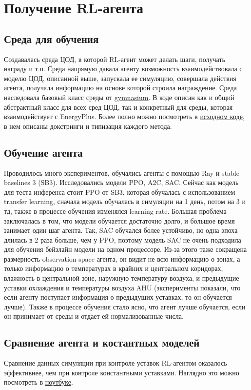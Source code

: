 \documentclass{article}
\begin{document}
\section{Получение RL-агента}

\subsection{Среда для обучения}
Создавалась среда ЦОД, в которой RL-агент может делать шаги, получать награду и т.п. Среда напрямую давала агенту возможность взаимодействовала с моделю ЦОД, описанной выше, запускала ее симуляцию, совершала действия агента, получала информацию на основе которой строила награждение. Среда наследовала базовый класс среды от \href{https://gymnasium.farama.org/index.html}{gymnasium}. В коде описан как и общий абстрактный класс для всех сред ЦОД, так и конкретный для среды, которая взаимодействует с EnergyPlus. Более полно можно посмотреть в \href{https://github.com/koshachya-myata/Data_Center_Simulation/blob/main/src/dc_env/data_center_env.py}{исходном коде}, в нем описаны докстринги и типизация каждого метода.

\subsection{Обучение агента}
Проводилось много экспериментов, обучались агенты с помощью Ray и stable baselines 3 (SB3). Исследовались модели PPO, A2C, SAC. Сейчас как модель для теста инференса стоит PPO от SB3, которая обучалась с использованием transfer learning, сначала модель обучалась в симуляции на 1 день, потом на 3 и тд, также в процессе обучения изменялся learning rate. Большая проблема заключалась в том, что модели обучается достаточно долго, и большое время занимает один шаг агента. Так, SAC обучался более устойчиво, но одна эпоха длилась в 2 раза больше, чем у PPO, поэтому модель SAC не очень подходила для обучения бейзлайн модели на одном процессоре. Из-за этого таже сокращена размерность observation space агента, он видит не всю информацию о зонах, а только информацию о температурах в крайних и центральном коридорах, влажность в центральной зоне, наружную температуру воздуха, и предыдущие уставки охлаждения и температуры воздуха AHU (эксперименты показали, что если агенту поступает информация о предыдущих уставках, то он обучается лучше). Также в процессе обучения стало ясно, что агент лучше обучается, если он принимает от среды и отдает ей нормализованные числа.

\subsection{Сравнение агента и костантных моделей}
Сравнение данных симуляции при контроле уставок RL-агентом оказалось эффективнее, чем при контроле константными уставками. Наглядно это можно посмотреть в  \href{https://github.com/koshachya-myata/Data_Center_Simulation/blob/main/notebooks/statistics.ipynb}{ноутбуке}.
\end{document}
